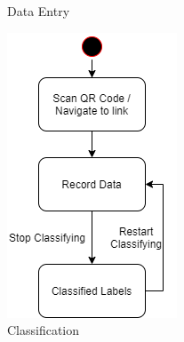 \begin{figure}[h!]
\begin{minipage}{0.5\textwidth}
        \caption{Data Entry}
    \end{minipage}
    \begin{minipage}{0.5\textwidth}
        \centering
        \includegraphics[width=.8\textwidth]{charts/flow3.png}
        \caption{Classification}
    \end{minipage}
\end{figure}